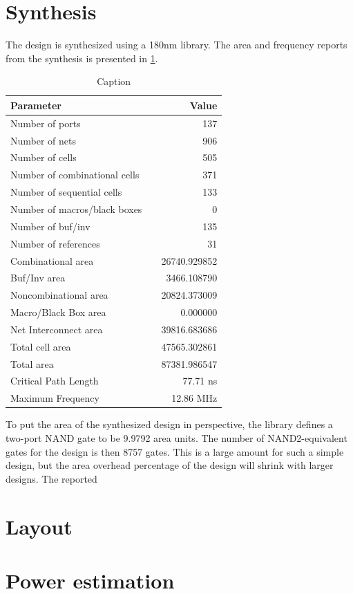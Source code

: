\section{Synthesis}
The design is synthesized using a 180nm library. The area and frequency reports from the synthesis is presented in \cref{tab:synthreportex}.
\begin{table}[]
    \centering
    \begin{tabular}{lcr}
        \textbf{Parameter} && \textbf{Value} \\
        \toprule
        Number of ports && 137 \\
        Number of nets && 906 \\
        Number of cells && 505 \\
        Number of combinational cells && 371 \\
        Number of sequential cells && 133 \\
        Number of macros/black boxes && 0 \\
        Number of buf/inv && 135 \\
        Number of references && 31 \\
        \midrule
        Combinational area && 26740.929852 \\
        Buf/Inv area && 3466.108790 \\
        Noncombinational area && 20824.373009 \\
        Macro/Black Box area && 0.000000 \\
        Net Interconnect area && 39816.683686 \\
        \midrule
        Total cell area && 47565.302861 \\
        Total area && 87381.986547 \\
        \midrule
        Critical Path Length && 77.71 ns \\
        Maximum Frequency && 12.86 MHz\\
        \bottomrule
    \end{tabular}
    \caption{Caption}
    \label{tab:synthreportex}
\end{table}
To put the area of the synthesized design in perspective, the library defines a two-port NAND gate to be 9.9792 area units. The number of NAND2-equivalent gates for the design is then 8757 gates. This is a large amount for such a simple design, but the area overhead percentage of the design will shrink with larger designs. The reported \section{Layout}

\section{Power estimation}

